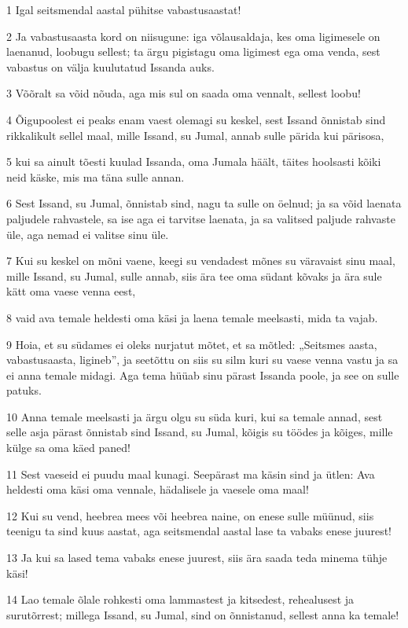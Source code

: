 \par 1 Igal seitsmendal aastal pühitse vabastusaastat!
\par 2 Ja vabastusaasta kord on niisugune: iga võlausaldaja, kes oma ligimesele on laenanud, loobugu sellest; ta ärgu pigistagu oma ligimest ega oma venda, sest vabastus on välja kuulutatud Issanda auks.
\par 3 Võõralt sa võid nõuda, aga mis sul on saada oma vennalt, sellest loobu!
\par 4 Õigupoolest ei peaks enam vaest olemagi su keskel, sest Issand õnnistab sind rikkalikult sellel maal, mille Issand, su Jumal, annab sulle pärida kui pärisosa,
\par 5 kui sa ainult tõesti kuulad Issanda, oma Jumala häält, täites hoolsasti kõiki neid käske, mis ma täna sulle annan.
\par 6 Sest Issand, su Jumal, õnnistab sind, nagu ta sulle on öelnud; ja sa võid laenata paljudele rahvastele, sa ise aga ei tarvitse laenata, ja sa valitsed paljude rahvaste üle, aga nemad ei valitse sinu üle.
\par 7 Kui su keskel on mõni vaene, keegi su vendadest mõnes su väravaist sinu maal, mille Issand, su Jumal, sulle annab, siis ära tee oma südant kõvaks ja ära sule kätt oma vaese venna eest,
\par 8 vaid ava temale heldesti oma käsi ja laena temale meelsasti, mida ta vajab.
\par 9 Hoia, et su südames ei oleks nurjatut mõtet, et sa mõtled: „Seitsmes aasta, vabastusaasta, ligineb”, ja seetõttu on siis su silm kuri su vaese venna vastu ja sa ei anna temale midagi. Aga tema hüüab sinu pärast Issanda poole, ja see on sulle patuks.
\par 10 Anna temale meelsasti ja ärgu olgu su süda kuri, kui sa temale annad, sest selle asja pärast õnnistab sind Issand, su Jumal, kõigis su töödes ja kõiges, mille külge sa oma käed paned!
\par 11 Sest vaeseid ei puudu maal kunagi. Seepärast ma käsin sind ja ütlen: Ava heldesti oma käsi oma vennale, hädalisele ja vaesele oma maal!
\par 12 Kui su vend, heebrea mees või heebrea naine, on enese sulle müünud, siis teenigu ta sind kuus aastat, aga seitsmendal aastal lase ta vabaks enese juurest!
\par 13 Ja kui sa lased tema vabaks enese juurest, siis ära saada teda minema tühje käsi!
\par 14 Lao temale õlale rohkesti oma lammastest ja kitsedest, rehealusest ja surutõrrest; millega Issand, su Jumal, sind on õnnistanud, sellest anna ka temale!
